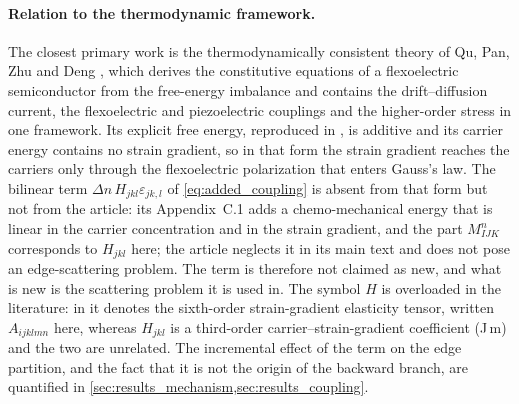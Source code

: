 \paragraph{Relation to the thermodynamic framework.}
The closest primary work is the thermodynamically consistent theory of Qu, Pan, Zhu and Deng \cite{qu2025thermodynamic}, which derives the constitutive equations of a flexoelectric semiconductor from the free-energy imbalance and contains the drift--diffusion current, the flexoelectric and piezoelectric couplings and the higher-order stress in one framework.  Its explicit free energy, reproduced in \cite{hu2025computational}, is additive and its carrier energy contains no strain gradient, so in that form the strain gradient reaches the carriers only through the flexoelectric polarization that enters Gauss's law.  The bilinear term $\Delta n\,H_{jkl}\varepsilon_{jk,l}$ of \eqref{eq:added_coupling} is absent from that form but not from the article: its Appendix~C.1 adds a chemo-mechanical energy that is linear in the carrier concentration and in the strain gradient, and the part $M^{n}_{IJK}$ corresponds to $H_{jkl}$ here; the article neglects it in its main text and does not pose an edge-scattering problem.  The term is therefore not claimed as new, and what is new is the scattering problem it is used in.  The symbol $H$ is overloaded in the literature: in \cite{hu2025computational} it denotes the sixth-order strain-gradient elasticity tensor, written $A_{ijklmn}$ here, whereas $H_{jkl}$ is a third-order carrier--strain-gradient coefficient (J\,m) and the two are unrelated.  The incremental effect of the term on the edge partition, and the fact that it is not the origin of the backward branch, are quantified in \cref{sec:results_mechanism,sec:results_coupling}.

